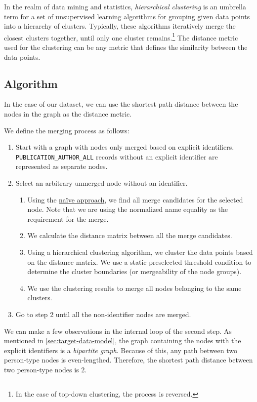In the realm of data mining and statistics, \textit{hierarchical clustering} is an umbrella term for a set of unsupervised learning algorithms for grouping
given data points into a hierarchy of clusters. Typically, these algorithms iteratively merge the closest clusters together, until only one cluster remains.\footnote{In the case of top-down clustering, the process is reversed.}
The distance metric used for the clustering can be any metric that defines the similarity between the data points.

\subsection{Algorithm}\label{sec:distance-based-hierarchical-clustering}

In the case of our dataset, we can use the shortest path distance between the nodes in the graph as the distance metric.

We define the merging process as follows:

\begin{enumerate}
    \item Start with a graph with nodes only merged based on explicit identifiers. \texttt{PUBLICATION\_AUTHOR\_ALL} records without an explicit identifier are represented as separate nodes.
    \item Select an arbitrary unmerged node without an identifier.
    \begin{enumerate}
        \item Using the \hyperref[sec:naive-approach]{naïve approach}, we find all merge candidates for the selected node. Note that we are using the normalized name equality as the requirement for the merge.
        \item We calculate the distance matrix between all the merge candidates.
        \item Using a hierarchical clustering algorithm, we cluster the data points based on the distance matrix. 
        We use a static preselected threshold condition to determine the cluster boundaries (or mergeability of the node groups).
        \item We use the clustering results to merge all nodes belonging to the same clusters.
    \end{enumerate}
    \item Go to step 2 until all the non-identifier nodes are merged.
\end{enumerate}

We can make a few observations in the internal loop of the second step.
As mentioned in \ref{sec:target-data-model}, the graph containing the nodes with the explicit identifiers is a \textit{bipartite graph}.
Because of this, any path between two person-type nodes is even-lengthed.
Therefore, the shortest path distance between two person-type nodes is 2.

